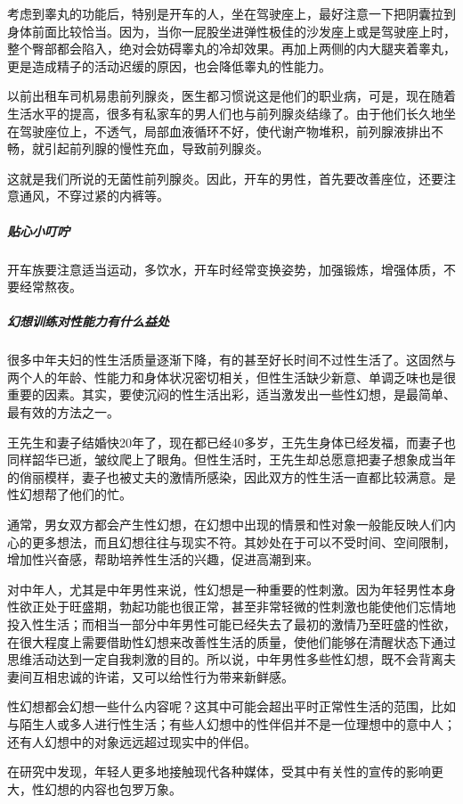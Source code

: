 考虑到睾丸的功能后，特别是开车的人，坐在驾驶座上，最好注意一下把阴囊拉到身体前面比较恰当。因为，当你一屁股坐进弹性极佳的沙发座上或是驾驶座上时，整个臀部都会陷入，绝对会妨碍睾丸的冷却效果。再加上两侧的内大腿夹着睾丸，更是造成精子的活动迟缓的原因，也会降低睾丸的性能力。

以前出租车司机易患前列腺炎，医生都习惯说这是他们的职业病，可是，现在随着生活水平的提高，很多有私家车的男人们也与前列腺炎结缘了。由于他们长久地坐在驾驶座位上，不透气，局部血液循环不好，使代谢产物堆积，前列腺液排出不畅，就引起前列腺的慢性充血，导致前列腺炎。

这就是我们所说的无菌性前列腺炎。因此，开车的男性，首先要改善座位，还要注意通风，不穿过紧的内裤等。

\subparagraph{贴心小叮咛}

开车族要注意适当运动，多饮水，开车时经常变换姿势，加强锻炼，增强体质，不要经常熬夜。

\subparagraph{幻想训练对性能力有什么益处}

很多中年夫妇的性生活质量逐渐下降，有的甚至好长时间不过性生活了。这固然与两个人的年龄、性能力和身体状况密切相关，但性生活缺少新意、单调乏味也是很重要的因素。其实，要使沉闷的性生活出彩，适当激发出一些性幻想，是最简单、最有效的方法之一。

王先生和妻子结婚快20年了，现在都已经40多岁，王先生身体已经发福，而妻子也同样韶华已逝，皱纹爬上了眼角。但性生活时，王先生却总愿意把妻子想象成当年的俏丽模样，妻子也被丈夫的激情所感染，因此双方的性生活一直都比较满意。是性幻想帮了他们的忙。

通常，男女双方都会产生性幻想，在幻想中出现的情景和性对象一般能反映人们内心的更多想法，而且幻想往往与现实不符。其妙处在于可以不受时间、空间限制，增加性兴奋感，帮助培养性生活的兴趣，促进高潮到来。

对中年人，尤其是中年男性来说，性幻想是一种重要的性刺激。因为年轻男性本身性欲正处于旺盛期，勃起功能也很正常，甚至非常轻微的性刺激也能使他们忘情地投入性生活；而相当一部分中年男性可能已经失去了最初的激情乃至旺盛的性欲，在很大程度上需要借助性幻想来改善性生活的质量，使他们能够在清醒状态下通过思维活动达到一定自我刺激的目的。所以说，中年男性多些性幻想，既不会背离夫妻间互相忠诚的许诺，又可以给性行为带来新鲜感。

性幻想都会幻想一些什么内容呢？这其中可能会超出平时正常性生活的范围，比如与陌生人或多人进行性生活；有些人幻想中的性伴侣并不是一位理想中的意中人；还有人幻想中的对象远远超过现实中的伴侣。

在研究中发现，年轻人更多地接触现代各种媒体，受其中有关性的宣传的影响更大，性幻想的内容也包罗万象。

